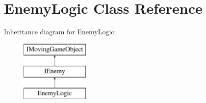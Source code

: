 \hypertarget{class_enemy_logic}{}\section{Enemy\+Logic Class Reference}
\label{class_enemy_logic}
Inheritance diagram for Enemy\+Logic\+:\begin{figure}[H]
\begin{center}
\leavevmode
\includegraphics[height=3.000000cm]{class_enemy_logic}
\end{center}
\end{figure}
